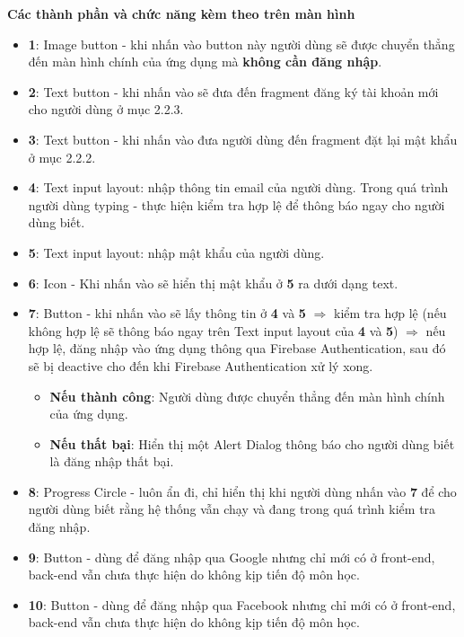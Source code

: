 \documentclass[12pt]{article}
\begin{document}
\indent \textbf{Các thành phần và chức năng kèm theo trên màn hình}
\begin{itemize}
    \item \textbf{1}: Image button - khi nhấn vào button này người dùng sẽ được chuyển thẳng đến màn hình chính của ứng dụng mà \textbf{không cần đăng nhập}.
    \item \textbf{2}: Text button - khi nhấn vào sẽ đưa đến fragment đăng ký tài khoản mới cho người dùng ở mục 2.2.3.
    \item \textbf{3}: Text button - khi nhấn vào đưa người dùng đến fragment đặt lại mật khẩu ở mục 2.2.2.
    \item \textbf{4}: Text input layout: nhập thông tin email của người dùng. Trong quá trình người dùng typing - thực hiện kiểm tra hợp lệ để thông báo ngay cho người dùng biết.
    \item \textbf{5}: Text input layout: nhập mật khẩu của người dùng.
    \item \textbf{6}: Icon - Khi nhấn vào sẽ hiển thị mật khẩu ở \textbf{5} ra dưới dạng text.
    \newpage
    \item \textbf{7}: Button - khi nhấn vào sẽ lấy thông tin ở \textbf{4} và \textbf{5} $\Rightarrow$  kiểm tra hợp lệ (nếu không hợp lệ sẽ thông báo ngay trên Text input layout của \textbf{4} và \textbf{5}) $\Rightarrow$ nếu hợp lệ, đăng nhập vào ứng dụng thông qua Firebase Authentication, sau đó sẽ bị deactive cho đến khi Firebase Authentication xử lý xong.
    \begin{itemize}
        \item \textbf{Nếu thành công}: Người dùng được chuyển thẳng đến màn hình chính của ứng dụng.
        \item \textbf{Nếu thất bại}: Hiển thị một Alert Dialog thông báo cho người dùng biết là đăng nhập thất bại.
    \end{itemize}
    \item \textbf{8}: Progress Circle - luôn ẩn đi, chỉ hiển thị khi người dùng nhấn vào \textbf{7} để cho người dùng biết rằng hệ thống vẫn chạy và đang trong quá trình kiểm tra đăng nhập.
    \item \textbf{9}: Button - dùng để đăng nhập qua Google nhưng chỉ mới có ở front-end, back-end vẫn chưa thực hiện do không kịp tiến độ môn học.
    \item \textbf{10}: Button - dùng để đăng nhập qua Facebook nhưng chỉ mới có ở front-end, back-end vẫn chưa thực hiện do không kịp tiến độ môn học.
\end{itemize}
\end{document}
